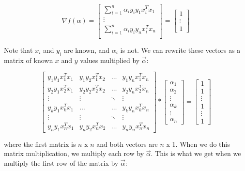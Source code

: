 \[
\nabla f(\alpha) = \begin{bmatrix}
        \sum\limits_{i=1}^{n} \alpha_iy_iy_1x_i^Tx_1 \\
        \vdots \\
        \sum\limits_{i=1}^{n} \alpha_iy_iy_nx_i^Tx_n \\
    \end{bmatrix} =
    \begin{bmatrix}
    1\\
    \vdots\\
    1
\end{bmatrix}
\]

Note that $x_i$ and $y_i$ are known, and $\alpha_i$ is not. We can rewrite these vectors as a matrix of known $x$ and $y$ values multiplied by $\vec{\alpha}$:

\begin{equation}
\begin{bmatrix} 
y_1 y_1 x_1^T x_1 & y_1 y_2 x_1^T x_2 & \dots & y_1 y_n x_1^T x_n \\
y_2 y_1 x_2^T x_1 & y_2 y_2 x_2^T x_2 & \dots & y_2 y_n x_2^T x_n \\
\vdots & \vdots & \ddots & \vdots \\
y_k y_1 x_k^T x_1 & \dots & \dots & y_k y_n x_k^T x_n\\
\vdots & \vdots & \ddots & \vdots \\
y_n y_1 x_n^T x_1 & y_n y_2 x_n^T x_2 & \dots & y_n y_n x_n^T x_n
\end{bmatrix}
    *
    \begin{bmatrix}
        \alpha_1\\
        \alpha_2\\
        \vdots\\
        \alpha_k\\
        \vdots\\
        \alpha_n
    \end{bmatrix} 
    = 
    \begin{bmatrix}
    1\\
    1\\
    \vdots\\
    1\\
    \vdots\\
    1
\end{bmatrix}
\end{equation}

where the first matrix is $n$ x $n$ and both vectors are $n$ x 1. When we do this matrix multiplication, we multiply each row by $\vec{\alpha}$. This is what we get when we multiply the first row of the matrix by $\vec{\alpha}$:

